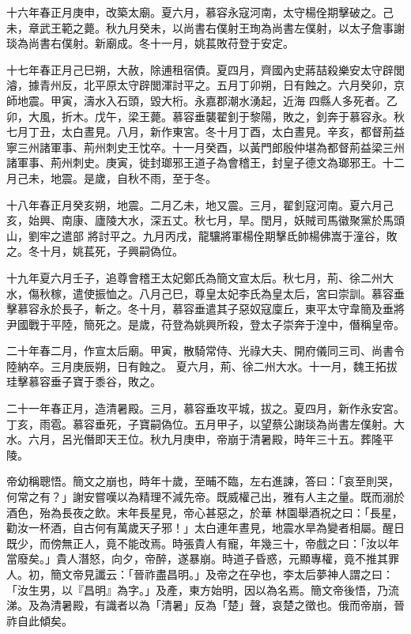 \begin{pinyinscope}
 十六年春正月庚申，改築太廟。夏六月，慕容永寇河南，太守楊佺期擊破之。己未，章武王範之薨。秋九月癸未，以尚書右僕射王珣為尚書左僕射，以太子詹事謝琰為尚書右僕射。新廟成。冬十一月，姚萇敗苻登于安定。



 十七年春正月己巳朔，大赦，除逋租宿債。夏四月，齊國內史蔣喆殺樂安太守辟閭濬，據青州反，北平原太守辟閭渾討平之。五月丁卯朔，日有蝕之。六月癸卯，京師地震。甲寅，濤水入石頭，毀大桁。永嘉郡潮水湧起，近海
 四縣人多死者。乙卯，大風，折木。戊午，梁王薨。慕容垂襲翟釗于黎陽，敗之，釗奔于慕容永。秋七月丁丑，太白晝見。八月，新作東宮。冬十月丁酉，太白晝見。辛亥，都督荊益寧三州諸軍事、荊州刺史王忱卒。十一月癸酉，以黃門郎殷仲堪為都督荊益梁三州諸軍事、荊州刺史。庚寅，徙封瑯邪王道子為會稽王，封皇子德文為瑯邪王。十二月己未，地震。是歲，自秋不雨，至于冬。



 十八年春正月癸亥朔，地震。二月乙未，地又震。三月，翟釗寇河南。夏六月己亥，始興、南康、廬陵大水，深五丈。秋七月，旱。閏月，妖賊司馬徽聚黨於馬頭山，劉牢之遣部
 將討平之。九月丙戌，龍驤將軍楊佺期擊氐帥楊佛嵩于潼谷，敗之。冬十月，姚萇死，子興嗣偽位。



 十九年夏六月壬子，追尊會稽王太妃鄭氏為簡文宣太后。秋七月，荊、徐二州大水，傷秋稼，遣使振恤之。八月己巳，尊皇太妃李氏為皇太后，宮曰崇訓。慕容垂擊慕容永於長子，斬之。冬十月，慕容垂遣其子惡奴寇廩丘，東平太守韋簡及垂將尹國戰于平陸，簡死之。是歲，苻登為姚興所殺，登太子崇奔于湟中，僭稱皇帝。



 二十年春二月，作宣太后廟。甲寅，散騎常侍、光祿大夫、開府儀同三司、尚書令陸納卒。三月庚辰朔，日有蝕之。
 夏六月，荊、徐二州大水。十一月，魏王拓拔珪擊慕容垂子寶于黍谷，敗之。



 二十一年春正月，造清暑殿。三月，慕容垂攻平城，拔之。夏四月，新作永安宮。丁亥，雨雹。慕容垂死，子寶嗣偽位。五月甲子，以望蔡公謝琰為尚書左僕射。大水。六月，呂光僭即天王位。秋九月庚申，帝崩于清暑殿，時年三十五。葬隆平陵。



 帝幼稱聰悟。簡文之崩也，時年十歲，至晡不臨，左右進諫，答曰：「哀至則哭，何常之有？」謝安嘗嘆以為精理不減先帝。既威權己出，雅有人主之量。既而溺於酒色，殆為長夜之飲。末年長星見，帝心甚惡之，於華
 林園舉酒祝之曰：「長星，勸汝一杯酒，自古何有萬歲天子邪！」太白連年晝見，地震水旱為變者相屬。醒日既少，而傍無正人，竟不能改焉。時張貴人有寵，年幾三十，帝戲之曰：「汝以年當廢矣。」貴人潛怒，向夕，帝醉，遂暴崩。時道子昏惑，元顯專權，竟不推其罪人。初，簡文帝見讖云：「晉祚盡昌明。」及帝之在孕也，李太后夢神人謂之曰：「汝生男，以『昌明』為字。」及產，東方始明，因以為名焉。簡文帝後悟，乃流涕。及為清暑殿，有識者以為「清暑」反為「楚」聲，哀楚之徵也。俄而帝崩，晉祚自此傾矣。




\end{pinyinscope}
